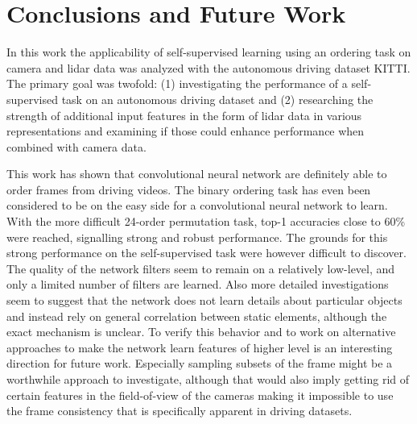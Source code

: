 %

\chapter{Conclusions and Future Work}
\label{ch:conclusion}
In this work the applicability of self-supervised learning using an ordering task on camera and lidar data was analyzed with the autonomous driving dataset KITTI. The primary goal was twofold: (1) investigating the performance of a self-supervised task on an autonomous driving dataset and (2) researching the strength of additional input features in the form of lidar data in various representations and examining if those could enhance performance when combined with camera data.

This work has shown that convolutional neural network are definitely able to order frames from driving videos. The binary ordering task has even been considered to be on the easy side for a convolutional neural network to learn. With the more difficult 24-order permutation task, top-1 accuracies close to 60\% were reached, signalling strong and robust performance. The grounds for this strong performance on the self-supervised task were however difficult to discover. The quality of the network filters seem to remain on a relatively low-level, and only a limited number of filters are learned. Also more detailed investigations seem to suggest that the network does not learn details about particular objects and instead rely on general correlation between static elements, although the exact mechanism is unclear. To verify this behavior and to work on alternative approaches to make the network learn features of higher level is an interesting direction for future work. Especially sampling subsets of the frame might be a worthwhile approach to investigate, although that would also imply getting rid of certain features in the field-of-view of the cameras making it impossible to use the frame consistency that is specifically apparent in driving datasets.  

